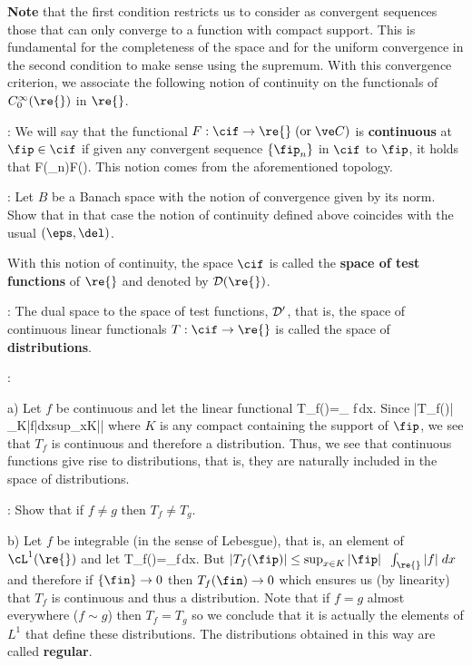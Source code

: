 \noi
{\bf Note} that the first condition restricts us to consider as convergent sequences those that can only converge to a function with compact support. This is fundamental for the completeness of the space and for the uniform convergence in the second condition to make sense using the supremum.
With this convergence criterion, we associate the following notion of continuity on the functionals of $C^{\infty}_0(\re{})$ in $\re{}$.

: 
We will say that the functional
$F:\cif\to\re{}\;(\mbox{or}\;\ve C)$ is {\bf continuous} 
at $\fip \in \cif$ if given
any convergent sequence $\{\fip_n\}$ in $\cif$ to $\fip$, it holds that
\beq
F(\fip_n)\longrightarrow F(\fip).
\eeq
This notion comes from the aforementioned topology.
\espa

\ejer: 
Let $B$ be a Banach space with the notion of
convergence given by its norm. Show that in that case the notion
of continuity defined above coincides with the usual $(\eps,\del)$.

\espa

With this notion of continuity, the space $\cif$ is called the {\bf
space of test functions} of $ \re{}$ and denoted by ${\cal D}(\re{})$.

\espa
\noi
{}: The dual space to the space of test functions, $\cal D'$, that is, the space of continuous linear functionals $T:\cif\to\re{}$ is called the space of {\bf distributions}.

\espa
\noi {}: 

\noi 
a) Let $f$ be continuous and let the linear functional
\beq
T_f(\fip)=\int_{\re{}} f\,\fip\;dx.
\eeq
Since 
\beq
|T_f(\fip)| \leq\lp\int_K|f|\;dx\rp\;sup_{x\in K}|\fip|
\eeq
where $K$ is any compact containing the support of $\fip$, we see that
$T_f$ is continuous and therefore a distribution. Thus, we see that
continuous functions give rise to distributions, that is, they are naturally included
in the space of distributions.

\ejer: Show that if $f\neq g$ then $T_f\neq T_g$.


\espa
\noi b) 
Let $f$ be integrable (in the sense of Lebesgue), that is, an
element of ${\cL}^1(\re{})$ and let 
\beq
T_f(\fip)=\int_{\re{}}f\,\fip\;dx\;\;\;\;\;\forall\;\;\fip\in\cif.
\eeq
But $|T_f(\fip)|\leq \sup_{x \in K}{|\fip|}\;\;\int_{\re{}}|f|\;dx$
 and therefore if $\{\fin\}\to 0$ then $T_f(\fin)\to 0$ which ensures us 
 (by linearity) that
$T_f$ is continuous and thus a distribution. Note that if $f=g$ almost
everywhere ($f\sim g$) then $T_f=T_g$ so we conclude that it is actually
the elements of $L^1$ that define these distributions. The
distributions obtained in this way are called {\bf regular}.
\espa

